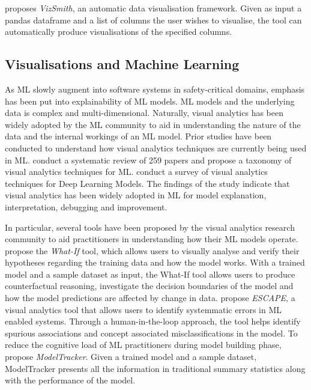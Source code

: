 \documentclass[acmsmall,screen,review,anonymous]{acmart}
\begin{document}
\citeauthor{bavishi2021vizsmith} proposes \textit{VizSmith}, an automatic data visualisation framework. Given as input a pandas dataframe and a list of columns the user wishes to visualise, the tool can automatically produce visualisations of the specified columns.

\subsection{Visualisations and Machine Learning}\label{sec:visualisations}


As ML slowly augment into software systems in safety-critical domains, emphasis has been put into explainability of ML models. ML models and the underlying data is complex and multi-dimensional. Naturally, visual analytics has been widely adopted by the ML community to aid in understanding the nature of the data and the internal workings of an ML model. Prior studies have been conducted to understand how visual analytics techniques are currently being used in ML. \citeauthor{yuan2021survey} conduct a systematic review of 259 papers and propose a taxonomy of visual analytics techniques for ML. \citeauthor{hohman2019visual} conduct a survey of visual analytics techniques for Deep Learning Models. The findings of the study indicate that visual analytics has been widely adopted in ML for model explanation, interpretation, debugging and improvement.

In particular, several tools have been proposed by the visual analytics research community to aid practitioners in understanding how their ML models operate. \citeauthor{wexler2020if} propose the \textit{What-If} tool, which allows users to visually analyse and verify their hypotheses regarding the training data and how the model works. With a trained model and a sample dataset as input, the What-If tool allows users to produce counterfactual reasoning, investigate the decision boundaries of the model and how the model predictions are affected by change in data. \citeauthor{ahn2023escape} propose \textit{ESCAPE}, a visual analytics tool that allows users to identify systemmatic errors in ML enabled systems. Through a human-in-the-loop approach, the tool helps identify spurious associations and concept associated misclassifications in the model. To reduce the cognitive load of ML practitioners during model building phase, \citeauthor{amershi2015modeltracker} propose \textit{ModelTracker}. Given a trained model and a sample dataset, ModelTracker presents all the information in traditional summary statistics along with the performance of the model.
\end{document}
